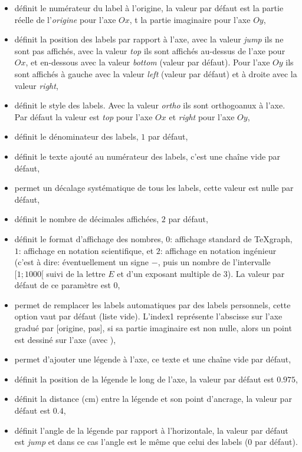 \begin{itemize}
\begin{itemize}
  \item {} définit le numérateur du label à l'origine, la valeur par défaut est la partie réelle de l'\emph{origine} pour l'axe $Ox$, t la partie imaginaire pour l'axe $Oy$,
  \item {} définit la position des labels par rapport à l'axe, avec la valeur \emph{jump} ils ne sont pas affichés, avec la valeur \emph{top} ils sont affichés au-dessus de l'axe pour $Ox$, et en-dessous avec la valeur \emph{bottom} (valeur par défaut). Pour l'axe $Oy$ ils sont affichés à gauche avec la valeur \emph{left} (valeur par défaut) et à droite avec la valeur \emph{right},
  \item {} définit le style des labels. Avec la valeur \emph{ortho} ils sont orthogoanux à l'axe. Par défaut la valeur est \emph{top} pour l'axe $Ox$ et \emph{right} pour l'axe $Oy$,
  \item {} définit le dénominateur des labels, $1$ par défaut,
  \item {} définit le texte ajouté au numérateur des labels, c'est une chaîne vide par défaut,
  \item {} permet un décalage systématique de tous les labels, cette valeur est nulle par défaut,  
  \item {} définit le nombre de décimales affichées, $2$ par défaut,
  \item {} définit le format d'affichage des nombres, $0$: affichage standard de TeXgraph, $1$: affichage en notation scientifique, et $2$: affichage en notation ingénieur (c'est à dire: éventuellement un signe $-$, puis un nombre de l'intervalle $[1; 1000[$ suivi de la lettre $E$ et d'un exposant multiple de $3$). La valeur par défaut de ce paramètre est $0$,
  \item {} permet de remplacer les labels automatiques par des labels personnels, cette option vaut \Nil par défaut (liste vide). L'index1 représente l'abscisse sur l'axe gradué par [origine, pas], si sa partie imaginaire est non nulle, alors un point est dessiné sur l'axe (avec ),
  \item {} permet d'ajouter une légende à l'axe, ce texte et une chaîne vide par défaut,
  \item {} définit la position de la légende le long de l'axe, la valeur par défaut est $0.975$,
  \item {} définit la distance (cm) entre la légende et son point d'ancrage, la valeur par défaut est $0.4$,
  \item {} définit l'angle de la légende par rapport à l'horizontale, la valeur par défaut est \emph{jump} et dans ce cas l'angle est le même que celui des labels ($0$ par défaut).
  \end{itemize}
\end{itemize}

